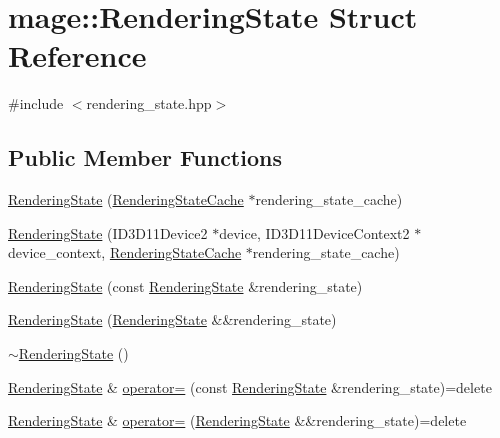 \hypertarget{structmage_1_1_rendering_state}{}\section{mage\+:\+:Rendering\+State Struct Reference}
\label{structmage_1_1_rendering_state}


{\ttfamily \#include $<$rendering\+\_\+state.\+hpp$>$}

\subsection*{Public Member Functions}
\begin{DoxyCompactItemize}
\item 
\hyperlink{structmage_1_1_rendering_state_acd2fe8a62bbd9c40e4b6d7dbee710223}{Rendering\+State} (\hyperlink{structmage_1_1_rendering_state_cache}{Rendering\+State\+Cache} $\ast$rendering\+\_\+state\+\_\+cache)
\item 
\hyperlink{structmage_1_1_rendering_state_a6a1914effafb160ff1d05c8a1963278a}{Rendering\+State} (I\+D3\+D11\+Device2 $\ast$device, I\+D3\+D11\+Device\+Context2 $\ast$device\+\_\+context, \hyperlink{structmage_1_1_rendering_state_cache}{Rendering\+State\+Cache} $\ast$rendering\+\_\+state\+\_\+cache)
\item 
\hyperlink{structmage_1_1_rendering_state_aa56cf6681d7e9e59124534dfea51be15}{Rendering\+State} (const \hyperlink{structmage_1_1_rendering_state}{Rendering\+State} \&rendering\+\_\+state)
\item 
\hyperlink{structmage_1_1_rendering_state_a70c843e9c1923d4b0d855fa7a57f38bd}{Rendering\+State} (\hyperlink{structmage_1_1_rendering_state}{Rendering\+State} \&\&rendering\+\_\+state)
\item 
\hyperlink{structmage_1_1_rendering_state_aaf45726193df68d65acffbbbf699cfa3}{$\sim$\+Rendering\+State} ()
\item 
\hyperlink{structmage_1_1_rendering_state}{Rendering\+State} \& \hyperlink{structmage_1_1_rendering_state_af03ad38dd9b88949fc9d3603e4829c26}{operator=} (const \hyperlink{structmage_1_1_rendering_state}{Rendering\+State} \&rendering\+\_\+state)=delete
\item 
\hyperlink{structmage_1_1_rendering_state}{Rendering\+State} \& \hyperlink{structmage_1_1_rendering_state_ad16e9963683b1eda6cbe675b8b210368}{operator=} (\hyperlink{structmage_1_1_rendering_state}{Rendering\+State} \&\&rendering\+\_\+state)=delete
\item 

\end{DoxyCompactItemize}
